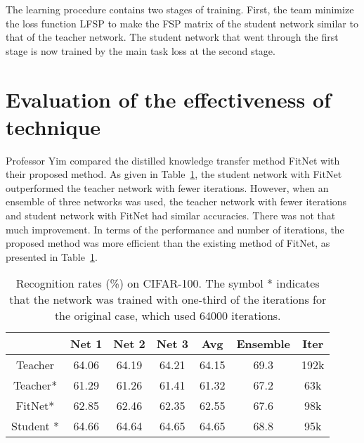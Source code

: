 \documentclass[twocolumn]{article}
\begin{document}
   The learning procedure contains two stages of training. First, the team minimize the loss function LFSP to make the FSP matrix of the student network similar to that of the teacher network. The student network that went through the first stage is now trained by the main task loss at the second stage.
   
   \section{Evaluation of the effectiveness of technique}
   Professor Yim compared the distilled knowledge transfer method FitNet with their proposed method. As given in Table~\ref{rate}, the student network with FitNet outperformed the teacher network with fewer iterations. However, when an ensemble of three networks was used, the teacher network with fewer iterations and student network with FitNet had similar accuracies. There was not that much improvement. In terms of the performance and number of iterations, the proposed method was more efficient than the existing method of FitNet, as presented in Table~\ref{rate}.
   \begin{table}[h]
   	\centering
   	\caption{Recognition rates (\%) on CIFAR-100. The symbol * indicates that the network was trained with one-third of the iterations for the original case, which used 64000 iterations.}\label{rate}
   	\begin{tabular}{|c|c|c|c|c|c|c|}
   		\hline\hline
   		         &Net 1& Net 2 & Net 3& Avg& Ensemble& Iter\\
   		\hline
   		Teacher &64.06& 64.19 &64.21& 64.15&69.3& 192k\\
   
   		Teacher*&61.29& 61.26& 61.41& 61.32& 67.2&63k\\
   		
   	FitNet\cite{Romero2014FitNets}*&62.85&62.46 &62.35&62.55& 67.6&98k\\
   		
   	  Student * &64.66& 64.64 & 64.65&64.65&68.8&95k\\
   		\hline\hline
   	\end{tabular}
   \end{table}
  

	
\end{document}
